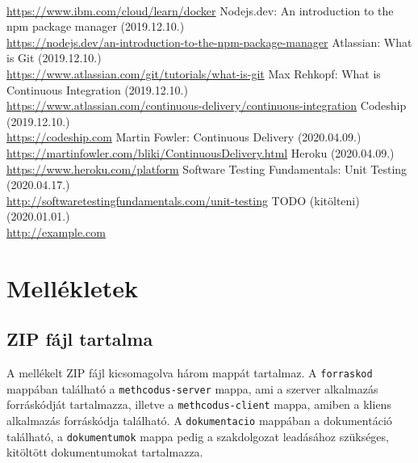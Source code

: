 \documentclass{elteikthesis}
\begin{document}
\begin{thebibliography}{99}
			\\\url{https://www.ibm.com/cloud/learn/docker}
			Nodejs.dev: An introduction to the npm package manager (2019.12.10.)
			\\\url{https://nodejs.dev/an-introduction-to-the-npm-package-manager}
			Atlassian: What is Git (2019.12.10.)
			\\\url{https://www.atlassian.com/git/tutorials/what-is-git}
			Max Rehkopf: What is Continuous Integration (2019.12.10.)
			\\\url{https://www.atlassian.com/continuous-delivery/continuous-integration}
			Codeship (2019.12.10.)
			\\\url{https://codeship.com}
			Martin Fowler: Continuous Delivery (2020.04.09.)
			\\\url{https://martinfowler.com/bliki/ContinuousDelivery.html}
			Heroku (2020.04.09.)
			\\\url{https://www.heroku.com/platform}
			Software Testing Fundamentals: Unit Testing (2020.04.17.)
			\\\url{http://softwaretestingfundamentals.com/unit-testing}
			TODO (kitölteni) (2020.01.01.)
			\\\url{http://example.com}

	\end{thebibliography}
	
	\chapter*{Mellékletek}


	\section*{ZIP fájl tartalma}
		A mellékelt ZIP fájl kicsomagolva három mappát tartalmaz. A \texttt{forraskod} mappában található a \texttt{methcodus-server} mappa, ami a szerver alkalmazás forráskódját tartalmazza, illetve a \texttt{methcodus-client} mappa, amiben a kliens alkalmazás forráskódja található. A \texttt{dokumentacio} mappában a dokumentáció található, a \texttt{dokumentumok} mappa pedig a szakdolgozat leadásához szükséges, kitöltött dokumentumokat tartalmazza.
\end{document}
